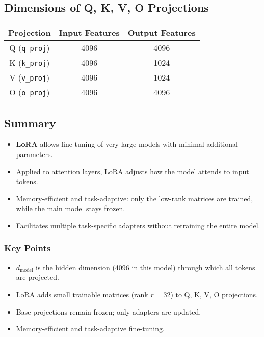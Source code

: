 \subsection{Dimensions of Q, K, V, O Projections}

\begin{tcolorbox}[colback=blue!5!white,colframe=blue!75!black,title=Attention Projection Dimensions]
\begin{tabular}{|c|c|c|}
\hline
\textbf{Projection} & \textbf{Input Features} & \textbf{Output Features} \\
\hline
Q (\texttt{q\_proj}) & 4096 & 4096 \\
K (\texttt{k\_proj}) & 4096 & 1024 \\
V (\texttt{v\_proj}) & 4096 & 1024 \\
O (\texttt{o\_proj}) & 4096 & 4096 \\
\hline
\end{tabular}
\end{tcolorbox}

\subsection{Summary}

\begin{itemize}
    \item \textbf{LoRA} allows fine-tuning of very large models with minimal additional parameters.  
    \item Applied to attention layers, LoRA adjusts how the model attends to input tokens.  
    \item Memory-efficient and task-adaptive: only the low-rank matrices are trained, while the main model stays frozen.  
    \item Facilitates multiple task-specific adapters without retraining the entire model.
\end{itemize}

\subsubsection{Key Points}

\begin{itemize}
    \item $d_{\text{model}}$ is the hidden dimension (4096 in this model) through which all tokens are projected.
    \item LoRA adds small trainable matrices (rank $r = 32$) to Q, K, V, O projections.
    \item Base projections remain frozen; only adapters are updated.
    \item Memory-efficient and task-adaptive fine-tuning.
\end{itemize}

